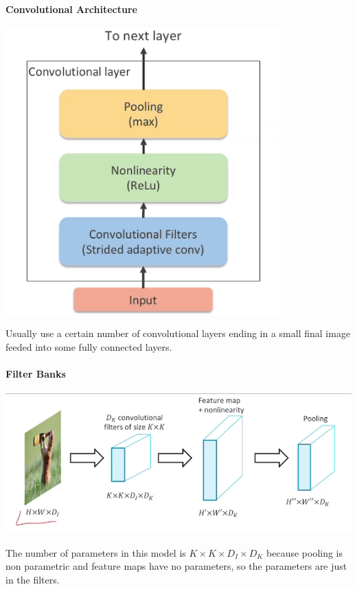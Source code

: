 \documentclass[10pt]{report}
\begin{document}
\paragraph{Convolutional Architecture}
\begin{center}
	\includegraphics[scale=0.5]{55.png}
\end{center}
Usually use a certain number of convolutional layers ending in a small final image feeded into some fully connected layers.
\paragraph{Filter Banks}
\begin{center}
	\includegraphics[scale=0.5]{56.png}
\end{center}
The number of parameters in this model is $K\times K\times D_I\times D_K$ because pooling is non parametric and feature maps have no parameters, so the parameters are just in the filters.
\end{document}
